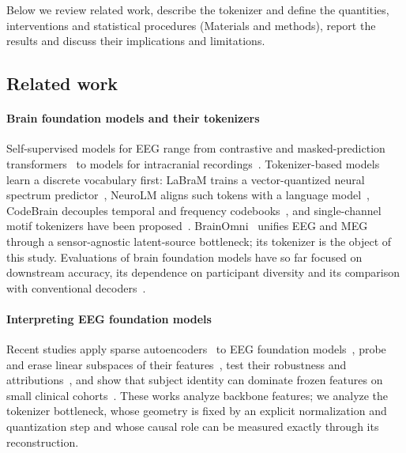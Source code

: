\documentclass[10pt,letterpaper]{article}
\begin{document}
Below we review related work, describe the tokenizer and define the quantities, interventions and
statistical procedures (Materials and methods), report the results and discuss their implications and
limitations.

\subsection*{Related work}\label{sec:related}

\paragraph*{Brain foundation models and their tokenizers}
Self-supervised models for EEG range from contrastive and masked-prediction
transformers~\cite{bendr2021,biot2023,cui2024neurogpt,wang2024eegpt,wang2025cbramod,
tegon2025femba,doner2025luna,zhou2025csbrain,elouahidi2025reve} to models for
intracranial recordings~\cite{brant2023,wang2023brainbert,brant2_2024}. Tokenizer-based
models learn a discrete vocabulary first: LaBraM trains a vector-quantized neural
spectrum predictor~\cite{labram2024}, NeuroLM aligns such tokens with a language model~\cite{jiang2025neurolm}, CodeBrain decouples temporal and frequency codebooks~\cite{ma2026codebrain}, and single-channel motif tokenizers have been proposed~\cite{pradeepkumar2026motif}. BrainOmni~\cite{brainomni2025} unifies EEG and MEG through a
sensor-agnostic latent-source bottleneck; its tokenizer is the object of this study. Evaluations of brain foundation
models have so far focused on downstream accuracy, its dependence on participant
diversity and its comparison with conventional decoders~\cite{yang2026eegfmworth,bomatter2025diversity,kuruppu2025eegfmreview,tholke2026megroadmap}.

\paragraph*{Interpreting EEG foundation models}
Recent studies apply sparse autoencoders~\cite{bricken2023monosemanticity,
cunningham2024sae,gao2024scaling} to EEG foundation models~\cite{lehnschioler2026saeeeg,cao2026validationladder}, probe and erase linear
subspaces of their features~\cite{tang2026eegfmcapture}, test their robustness and
attributions~\cite{sirca2026beyondaccuracy}, and show that subject identity can
dominate frozen features on small clinical cohorts~\cite{lin2026identitytrap}. These
works analyze backbone features; we analyze the tokenizer bottleneck, whose geometry is
fixed by an explicit normalization and quantization step and whose causal role can be
measured exactly through its reconstruction.
\end{document}
